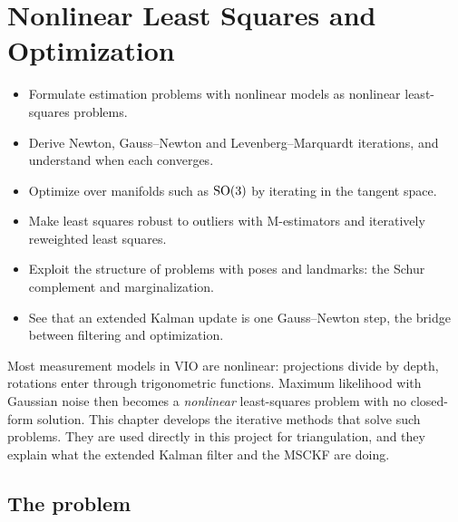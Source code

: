 \chapter{Nonlinear Least Squares and Optimization}
\label{ch:nlls}

\begin{objectives}
\begin{itemize}
  \item Formulate estimation problems with nonlinear models as nonlinear least-squares problems.
  \item Derive Newton, Gauss--Newton and Levenberg--Marquardt iterations, and understand when each converges.
  \item Optimize over manifolds such as $\mathrm{SO}(3)$ by iterating in the tangent space.
  \item Make least squares robust to outliers with M-estimators and iteratively reweighted least squares.
  \item Exploit the structure of problems with poses and landmarks: the Schur complement and marginalization.
  \item See that an extended Kalman update is one Gauss--Newton step, the bridge between filtering and optimization.
\end{itemize}
\end{objectives}

Most measurement models in VIO are nonlinear: projections divide by depth, rotations enter through trigonometric functions. Maximum
likelihood with Gaussian noise then becomes a \emph{nonlinear} least-squares problem with no closed-form solution. This chapter develops the
iterative methods that solve such problems. They are used directly in this project for triangulation, and they explain what the extended
Kalman filter and the MSCKF are doing.

\section{The problem}

